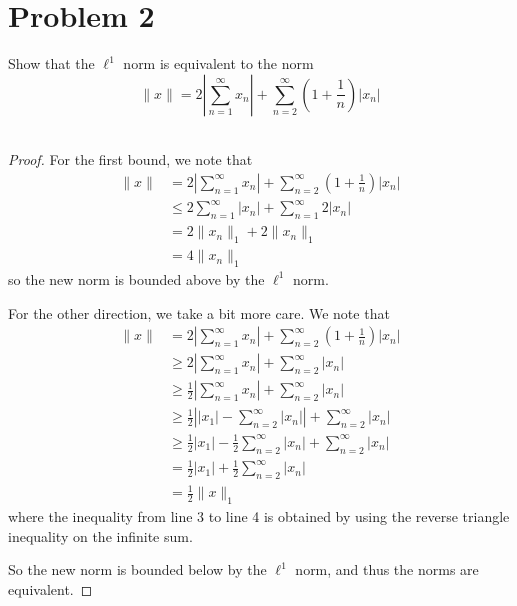 \documentclass[fontsize=11pt]{scrartcl} %
\numberwithin{equation}{section} %
\numberwithin{figure}{section} %
\numberwithin{table}{section} %
\begin{document}
\section*{Problem 2}
Show that the $\ell^1$ norm is equivalent to the norm
\[
    \|x\| = 2\left|\sum_{n=1}^{\infty}x_n\right| +
    \sum_{n=2}^{\infty}\left(1+\frac{1}{n}\right)|x_n|
\]
\\
\begin{proof}
    For the first bound, we note that
\[
    \begin{aligned}
        \|x\| &= 2\left|\sum_{n=1}^{\infty}x_n\right| +
        \sum_{n=2}^{\infty}\left(1+\frac{1}{n}\right)|x_n|\\
        &\leq 2\sum_{n=1}^{\infty}|x_n| + \sum_{n=1}^{\infty}2|x_n|\\
        &= 2\|x_n\|_1 + 2\|x_n\|_1\\
        &= 4\|x_n\|_1
\end{aligned}
\]
so the new norm is bounded above by the $\ell^1$ norm.

For the other direction, we take a bit more care. We note that
\[
    \begin{aligned}
        \|x\| &= 2\left|\sum_{n=1}^{\infty}x_n\right| +
    \sum_{n=2}^{\infty}\left(1+\frac{1}{n}\right)|x_n|\\
            &\geq 2\left|\sum_{n=1}^{\infty}x_n\right| +
        \sum_{n=2}^{\infty}|x_n|\\
            &\geq \frac{1}{2}\left|\sum_{n=1}^{\infty}x_n\right| +
        \sum_{n=2}^{\infty} |x_n|\\
            &\geq \frac{1}{2}\left||x_1|-\sum_{n=2}^{\infty}|x_n|\right| +
        \sum_{n=2}^{\infty} |x_n|\\
            &\geq \frac{1}{2}|x_1| -\frac{1}{2}\sum_{n=2}^{\infty}|x_n| +
            \sum_{n=2}^{\infty}|x_n|\\
            &= \frac{1}{2}|x_1| + \frac{1}{2}\sum_{n=2}^{\infty}|x_n|\\
            &=\frac{1}{2}\|x\|_1
    \end{aligned}
\]
where the inequality from line 3 to line 4 is obtained by using the reverse
    triangle inequality on the infinite sum.

So the new norm is bounded below by the $\ell^1$ norm, and thus the norms
    are equivalent.
\end{proof}

\newpage
\end{document}
